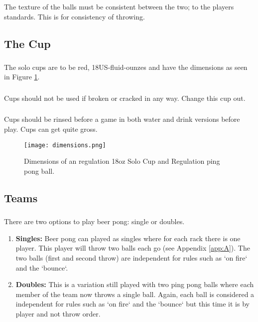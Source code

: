         \subsubsection{}\label{sssec:Balls,texture}
            The texture of the balls must be consistent between the two; to the players standards. This is for consistency of throwing.

	\subsection{The Cup}\label{ssec:Cup}
			\subsubsection{}\label{sssec:Cup,dim}
				The solo cups are to be red, 18US-fluid-ounzes and have the dimensions as seen in Figure \ref{fig:solocup}.
			\subsubsection{}\label{sssec:Cup,broken}
				Cups should not be used if broken or cracked in any way. Change this cup out.
            \subsubsection{}\label{ssec:Cup,rinsing}
                Cups should be rinsed before a game in both water and drink versions before play. Cups can get quite gross.

    \begin{figure}
        \centering
        \texttt{[image: dimensions.png]}
        \caption{Dimensions of an regulation 18oz Solo Cup and Regulation ping pong ball.}
        \label{fig:solocup}
    \end{figure}
			
	\subsection{Teams}\label{ssec:Teams}
		\subsubsection{}\label{sssec:teams,options}
			There are two options to play beer pong: single or doubles.
            \begin{enumerate}[label=(\alph*), leftmargin=2cm]%
                \itemsep -1.25em 
                \item \textbf{Singles:} Beer pong can played as singles where for each rack there is one player.
                        This player will throw two balls each go (see Appendix \ref{app:A}).
                        The two balls (first and second throw) are independent for rules such as `on fire` and the `bounce`.\\
                \item \textbf{Doubles:}	This is a variation still played with two ping pong balls where each member of the team now throws a single ball.
                        Again, each ball is considered a independent for rules such as `on fire` and the `bounce` but this time it is by player and not throw order.
            \end{enumerate}
